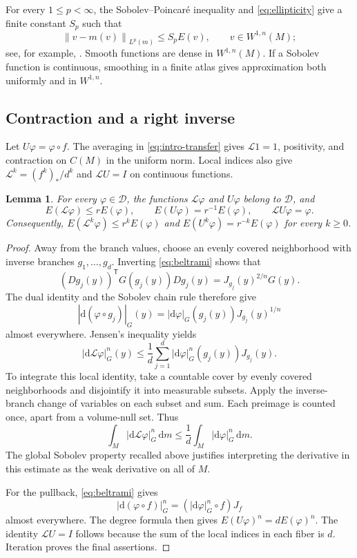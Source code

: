 \documentclass[10pt,a4paper]{amsart}
\newtheorem{lemma}[theorem]{Lemma}
\newcommand{\Lop}{\mathcal L}
\newcommand{\Dcal}{\mathcal D}
\newcommand{\norm}[1]{\left\lVert #1\right\rVert}
\newcommand{\dd}{\mathrm d}
\numberwithin{equation}{section}
\begin{document}
For every $1\le p<\infty$, the Sobolev--Poincar\'e inequality and \eqref{eq:ellipticity} give a finite constant $S_p$ such that
\begin{equation}\label{eq:sobolev-poincare}
 \norm{v-m(v)}_{L^p(m)}\le S_p E(v),\qquad v\in W^{1,n}(M);
\end{equation}
see, for example, \cite[Chapter 2]{Hebey00}. Smooth functions are dense in $W^{1,n}(M)$. If a Sobolev function is continuous, smoothing in a finite atlas gives approximation both uniformly and in $W^{1,n}$.

\subsection{Contraction and a right inverse}

Let $U\varphi=\varphi\circ f$. The averaging in \eqref{eq:intro-transfer} gives $\Lop1=1$, positivity, and contraction on $C(M)$ in the uniform norm. Local indices also give $\Lop^k=(f^k)_*/d^k$ and $\Lop U=I$ on continuous functions.

\begin{lemma}\label{lem:energy}
For every $\varphi\in\Dcal$, the functions $\Lop\varphi$ and $U\varphi$ belong to $\Dcal$, and
\begin{equation}\label{eq:energy-pair}
 E(\Lop\varphi)\le rE(\varphi),
 \qquad E(U\varphi)=r^{-1}E(\varphi),
 \qquad \Lop U\varphi=\varphi.
\end{equation}
Consequently, $E(\Lop^k\varphi)\le r^kE(\varphi)$ and $E(U^k\varphi)=r^{-k}E(\varphi)$ for every $k\ge0$.
\end{lemma}

\begin{proof}
Away from the branch values, choose an evenly covered neighborhood with inverse branches $g_1,\ldots,g_d$. Inverting \eqref{eq:beltrami} shows that
\[
 (Dg_j(y))^{\mathsf T}G(g_j(y))Dg_j(y)
 =J_{g_j}(y)^{2/n}G(y).
\]
The dual identity and the Sobolev chain rule therefore give
\[
 |\dd(\varphi\circ g_j)|_G(y)
 =|\dd\varphi|_G(g_j(y))J_{g_j}(y)^{1/n}
\]
almost everywhere. Jensen's inequality yields
\begin{equation}\label{eq:pointwise-transfer}
 |\dd\Lop\varphi|_G^n(y)
 \le\frac1d\sum_{j=1}^d
 |\dd\varphi|_G^n(g_j(y))J_{g_j}(y).
\end{equation}
To integrate this local identity, take a countable cover by evenly covered neighborhoods and disjointify it into measurable subsets. Apply the inverse-branch change of variables on each subset and sum. Each preimage is counted once, apart from a volume-null set. Thus
\[
 \int_M|\dd\Lop\varphi|_G^n\,\dd m
 \le\frac1d\int_M|\dd\varphi|_G^n\,\dd m.
\]
The global Sobolev property recalled above justifies interpreting the derivative in this estimate as the weak derivative on all of $M$.

For the pullback, \eqref{eq:beltrami} gives
\[
 |\dd(\varphi\circ f)|_G^n
 =(|\dd\varphi|_G^n\circ f)J_f
\]
almost everywhere. The degree formula then gives $E(U\varphi)^n=dE(\varphi)^n$. The identity $\Lop U=I$ follows because the sum of the local indices in each fiber is $d$. Iteration proves the final assertions.
\end{proof}
\end{document}
